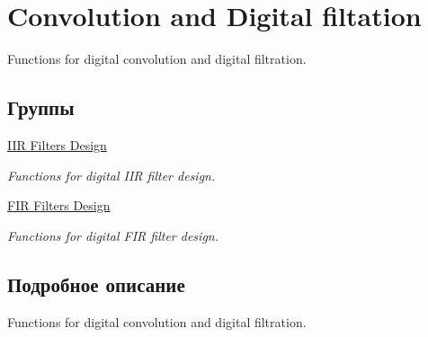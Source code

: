 \hypertarget{group___f_i_l_t_e_r___g_r_o_u_p}{}\section{Convolution and Digital filtation}
\label{group___f_i_l_t_e_r___g_r_o_u_p}


Functions for digital convolution and digital filtration.  


\subsection*{Группы}
\begin{DoxyCompactItemize}
\item 
\hyperlink{group___i_i_r___f_i_l_t_e_r___d_e_s_i_g_n___g_r_o_u_p}{I\+I\+R Filters Design}
\begin{DoxyCompactList}\small\item\em Functions for digital I\+I\+R filter design. \end{DoxyCompactList}\item 
\hyperlink{group___f_i_r___f_i_l_t_e_r___d_e_s_i_g_n___g_r_o_u_p}{F\+I\+R Filters Design}
\begin{DoxyCompactList}\small\item\em Functions for digital F\+I\+R filter design. \end{DoxyCompactList}\end{DoxyCompactItemize}


\subsection{Подробное описание}
Functions for digital convolution and digital filtration. 

